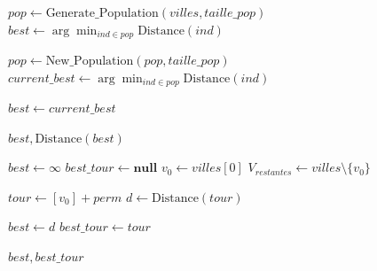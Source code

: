 \documentclass[a4paper,12pt]{article}
\begin{document}
\begin{algorithm}
\caption{Algorithme Génétique pour le TSP}
\label{alg:tsp}
\begin{algorithmic}[1] %
    \State $pop \gets \text{Generate\_Population}(villes, taille\_pop)$
    \State $best \gets \arg\min_{ind \in pop} \text{Distance}(ind)$
    
        \State $pop \gets \text{New\_Population}(pop, taille\_pop)$
        \State $current\_best \gets \arg\min_{ind \in pop} \text{Distance}(ind)$
        
            \State $best \gets current\_best$
        \EndIf
    \EndFor
    
    \State \Return $best, \text{Distance}(best)$
\EndProcedure
\end{algorithmic}
\end{algorithm}

\begin{algorithm}
\caption{Bruteforce pour la résolution du TSP}
\label{alg:tsp_bruteforce}
\begin{algorithmic}[1]
    \State $best \gets \infty$
    \State $best\_tour \gets \textbf{null}$
    \State $v_0 \gets villes[0]$ 
    \State $V_{restantes} \gets villes \setminus \{v_0\}$
    
        \State $tour \gets [v_0] + perm$ 
        \State $d \gets \text{Distance}(tour)$
        
            \State $best \gets d$
            \State $best\_tour \gets tour$
        \EndIf
    \EndFor
    
    \State \Return $best, best\_tour$
\EndProcedure
\end{algorithmic}
\end{algorithm}
\end{document}
